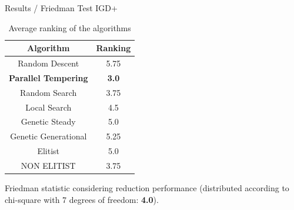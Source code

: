 \documentclass{beamer}
\begin{document}
    \begin{frame}{Results / Friedman Test IGD+}
        \begin{table}[!htp]
            \centering
            \caption{Average ranking of the algorithms}
            \begin{tabular}{c|c}
            Algorithm&Ranking\\
            \hline
            Random Descent&5.75\\
            \textbf{Parallel Tempering}&\textbf{3.0}\\
            Random Search&3.75\\
            Local Search&4.5\\
            Genetic Steady&5.0\\
            Genetic Generational&5.25\\
            Elitist&5.0\\
            NON ELITIST&3.75\\
            \end{tabular}
        \end{table}
        Friedman statistic considering reduction performance (distributed according to chi-square with 7 degrees of freedom: \textbf{4.0}).
    \end{frame}
    
\end{document}
